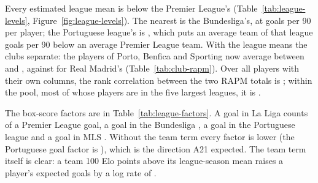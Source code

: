 \documentclass[11pt,a4paper]{article}
\begin{document}
Every estimated league mean is below the Premier League's
(Table~\ref{tab:league-levels}, Figure~\ref{fig:league-levels}). The nearest is
the Bundesliga's, at \LeagueMuGermany{} goals per 90 per player; the Portuguese
league's is \LeagueMuPortugal{}, which puts an average team of that league
\LeagueGapPortugal{} goals per 90 below an average Premier League team. With
the league means the clubs separate: the players of Porto, Benfica and
Sporting now average between \ClubRapmLeaguePortugalLo{} and
\ClubRapmLeaguePortugalHi{}, against \ClubRapmLeagueRealMadrid{} for Real
Madrid's (Table~\ref{tab:club-rapm}). Over all players with their own columns,
the rank correlation between the two RAPM totals is \LeagueRapmSpearmanAll{};
within the pool, most of whose players are in the five largest leagues, it is
\LeagueRapmSpearmanPool{}.

The box-score factors are in Table~\ref{tab:league-factors}. A goal in La Liga
counts \FactorGoalsSpain{} of a Premier League goal, a goal in the Bundesliga
\FactorGoalsGermany{}, a goal in the Portuguese league \FactorGoalsPortugal{}
and a goal in MLS \FactorGoalsMls{}. Without the team term every factor is
lower (the Portuguese goal factor is \FactorGoalsPortugalPlain{}), which is the
direction A21 expected. The team term itself is clear: a team 100 Elo points
above its league-season mean raises a player's expected goals by a log rate of
\FactorTeamEloGoals{}.
\end{document}
